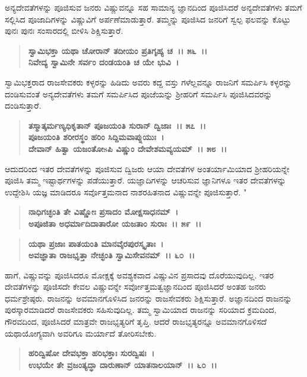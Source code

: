 ಅನ್ಯದೇವತೆಗಳನ್ನು ಪೂಜಿಸುವ ಜನರು ವಿಷ್ಣುವನ್ನೂ ಸಹ ಸಾಮಾನ್ಯ ಜ್ಞಾನದಿಂದ ಪೂಜಿಸಿದರೆ ಅನ್ಯದೇವತೆಗಳು ತಮಗೆ ಸಲ್ಲಿಸಿದ ಪೂಜಾದಿಗಳನ್ನು ವಿಷ್ಣುವಿಗೆ ಅರ್ಪಣೆಮಾಡುತ್ತಾರೆ. ತಮ್ಮನ್ನು ಪೂಜಿಸಿದ ಜನರಿಗೆ ಸ್ವಲ್ಪ ಫಲವನ್ನು ಕೊಟ್ಟು ಪುನಃ ಪುನಃ ಸಂಸಾರದಲ್ಲಿ ಬೀಳಿಸಿ ಶಿಕ್ಷಿಸುತ್ತಾರೆ.

\begin{verse}
\textbf{ಸ್ವಾಮಿಭಕ್ತಾ ಯಥಾ ಚೋರಾನ್ ತದೀಯಂ ಪ್ರತಿಗೃಹ್ಯ ಚ~।। ೫೬~।।}\\\textbf{ನಿವೇದ್ಯ ಸ್ವಾಮಿನೇ ಸರ್ವಂ ದಂಡಯಂತಿ ಚ ಯೇ ಭುವಿ~।}
\end{verse}

ಸ್ವಾಮಿಭಕ್ತರಾದ ರಾಜಸೇವಕರು ಕಳ್ಳರನ್ನು ಹಿಡಿದು ಅವರು ಕದ್ದ ವಸ್ತು ಗಳೆಲ್ಲವನ್ನೂ ರಾಜನಿಗೆ ಸಮರ್ಪಿಸಿ ಕಳ್ಳರನ್ನು ದಂಡಿಸುವಂತೆ ಅನ್ಯದೇವತೆಗಳು ತಮಗೆ ಸಮರ್ಪಿಸಿದ ಪೂಜೆಯನ್ನು ಶ‍್ರೀಹರಿಗೆ ಸಮರ್ಪಿಸಿ ಪೂಜಿಸಿದವರನ್ನು ದಂಡಿಸುತ್ತಾರೆ.

\begin{verse}
\textbf{ತಸ್ಮಾತ್ಕರ್ಮಣ್ಯಧಿಕೃತಾನ್ ಪೂಜಯಂತಿ ಸುರಾನ್ ದ್ವಿಜಾಃ~।। ೫೭~।।}\\\textbf{ಪೂಜಯಂತಿ ಶರೀರಸ್ಥಂ ಹರಿಂ ಸಿದ್ದಿಮವಾಪ್ನುಯುಃ~। }\\\textbf{ದೇವಾನ್ ಹಿತ್ವಾ ಯಜಂತೋsಪಿ ವಿಷ್ಣುಂ ದೇವೇಶಮವ್ಯಯಮ್~।। ೫೮~।।}
\end{verse}

ಆದುದರಿಂದ ಇತರ ದೇವತೆಗಳನ್ನು ಪೂಜಿಸುವ ದ್ವಿಜರು ಆಯಾ ದೇವತೆಗಳ ಅಂತ\-ರ್ಯಾಮಿಯಾದ ಶ‍್ರೀಹರಿಯನ್ನೇ ಪೂಜಿಸಿ ತಮ್ಮ ಇಷ್ಟಾರ್ಥಗಳನ್ನು ಪಡೆಯುತ್ತಾರೆ. ಯಜ್ಞಾದಿಗಳನ್ನು ಆಚರಿಸುವ ಜ್ಞಾನಿಗಳೂ ಇತರ ದೇವತೆಗಳನ್ನು ಉದ್ದೇಶಿಸಿ ಯಜ್ಞ ಮಾಡಿದರೂ ಸರ್ವೊತ್ತಮನಾದ ನಾಶರಹಿತನಾದ ವಿಷ್ಣುವನ್ನೇ ಪೂಜಿಸುತ್ತಾರೆ. "

\begin{verse}
\textbf{ನಾಧಿಗಚ್ಛಂತಿ ತೇ ವಿಷ್ಣೋಃ ಪ್ರಸಾದಂ ಮೋಕ್ಷಸಾಧನಮ್~।}\\\textbf{ಅಪೂಜಿತಾ ಅಧರ್ಮಾದಿದಾತಾರೋ ಯಜತಾಂ ಸುರಾಃ~।। ೫೯~।। }
\end{verse}

\begin{verse}
\textbf{ಯಥಾ ಪ್ರಜಾಃ ಪಾತಯಂತಿ ಮಾನವೈರಪುರಸ್ಕೃತಾಃ~।}\\\textbf{ಅವಜ್ಞಾತಾ ರಾಜಭೃತ್ತಾ ನೇಚ್ಛಂತಿ ಸ್ವಾಮಿಸೇವನಮ್~।। ೬೦~।।}
\end{verse}

ಹಾಗೆ, ವಿಷ್ಣುವನ್ನು ಪೂಜಿಸಿದರೂ ಮೋಕ್ಷಕ್ಕೆ ಅವಶ್ಯಕವಾದ ವಿಷ್ಣುವಿನ ಪ್ರಸಾದವು ದೊರೆಯುವುದಿಲ್ಲ. ಇತರ ದೇವತೆಗಳನ್ನು ಪೂಜಿಸದೇ ಕೇವಲ ವಿಷ್ಣುವನ್ನೇ ಸರ್ವೋತ್ತಮತ್ವ\-ಜ್ಞಾನದಿಂದ ಪೂಜಿಸಿದರೆ ಅಂತಹ ಜನರು ಧರ್ಮಶ್ರೇಷ್ಠರು. ರಾಜನನ್ನು ಅವಮಾನಗೊಳಿಸಿದ ಜನರನ್ನು ರಾಜಸೇವಕರು ಶಿಕ್ಷಿಸುತ್ತಾರೆ. ಅಜ್ಞಾನದಿಂದ ರಾಜನನ್ನು ಪುರಸ್ಕಾರಮಾಡಿದರೆ ರಾಜಸೇವಕರು ಸಹಿಸುವುದಿಲ್ಲ. ತಮ್ಮ ಸ್ವಾಮಿಯಾದ ರಾಜನನ್ನು ಸರಿಯಾದ ಕ್ರಮದಿಂದ, ಗೌರವದಿಂದ, ಪೂಜಿಸಿದರೆ ಮಾತ್ರವೇ ರಾಜಭೃತ್ಯರಿಗೆ ತೃಪ್ತಿ. ಆದರೆ ರಾಜಭೃತ್ಯರನ್ನೂ ಅವಮಾನಗೊಳಿಸದೆ ಯಥಾಯೋಗ್ಯವಾಗಿ ಅವರಿಗೂ ಮರ್ಯಾದೆ ತೋರಿಸಬೇಕು.

\begin{verse}
\textbf{ಹರಿದ್ವಿಷೋ ದೇವಭಕ್ತಾ ಹರಿಭಕ್ತಾಃ ಸುರದ್ವಿಷಃ~।}\\\textbf{ಉಭಯೇ ತೇ ವ್ರಜಂತ್ಯದ್ಧಾ ದಾರುಣಾನ್ ಯಾತನಾಲಯಾನ್~।। ೬೦~।।}
\end{verse}

